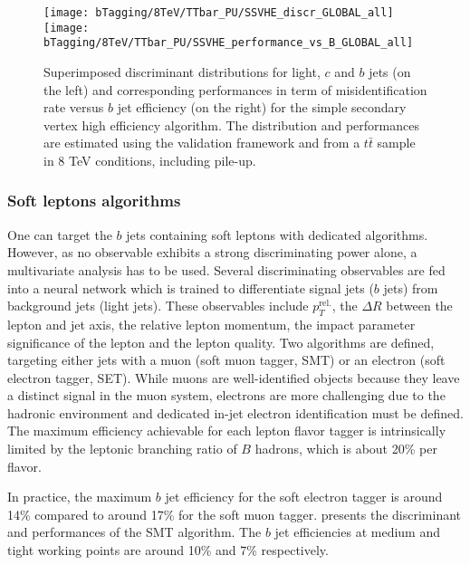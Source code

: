     \begin{figure}[th!]
        \centering
        \begin{minipage}{\textwidth}
        \texttt{[image: bTagging/8TeV/TTbar\_PU/SSVHE\_discr\_GLOBAL\_all]}
        \texttt{[image: bTagging/8TeV/TTbar\_PU/SSVHE\_performance\_vs\_B\_GLOBAL\_all]}
        \end{minipage}
        \caption{Superimposed discriminant distributions for light, $c$ and $b$
        jets (on the left) and corresponding performances in term of
        misidentification rate versus $b$ jet efficiency (on the right) for the
        simple secondary vertex high efficiency algorithm.  The distribution and
        performances are estimated using the validation framework and from a
        $t\bar{t}$ sample in 8 TeV conditions, including pile-up.}
        \label{fig:bTagging/perfSSV}
    \end{figure}

        \subsubsection{Soft leptons algorithms}

    One can target the $b$ jets containing soft leptons with dedicated
    algorithms. However, as no observable exhibits a strong discriminating power
    alone, a multivariate analysis has to be used. Several discriminating
    observables are fed into a neural network which is trained to differentiate
    signal jets ($b$ jets) from background jets (light jets).  These observables
    include $p_T^\text{rel.}$, the $\Delta R$ between the lepton and jet axis,
    the relative lepton momentum, the impact parameter significance of the
    lepton and the lepton quality. Two algorithms are defined, targeting either
    jets with a muon (soft muon tagger, SMT) or an electron (soft electron
    tagger, SET). While muons are well-identified objects because they leave a
    distinct signal in the muon system, electrons are more challenging due to
    the hadronic environment and dedicated in-jet electron identification must
    be defined. The maximum efficiency achievable for each lepton flavor tagger
    is intrinsically limited by the leptonic branching ratio of $B$ hadrons,
    which is about 20\% per flavor.

    In practice, the maximum $b$ jet efficiency for the soft electron tagger is
    around 14\% compared to around 17\% for the soft muon tagger.
     presents the discriminant and performances of
    the SMT algorithm. The $b$ jet efficiencies at medium and tight working
    points are around 10\% and 7\% respectively.

